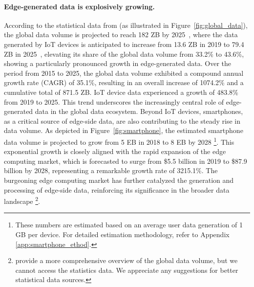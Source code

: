 \paragraph{Edge-generated data is explosively growing.} 
According to the statistical data from \cite{statista_global_2023,statista_iot_2023} (as illustrated in Figure~\ref{fig:global_data}), 
the global data volume is projected to reach 182 ZB by 2025~\cite{statista_global_2023}, where the data generated by IoT devices is anticipated to increase from 13.6 ZB in 2019 to 79.4 ZB in 2025~\cite{statista_iot_2023}, elevating its share of the global data volume from 33.2\% to 43.6\%, showing a particularly pronounced growth in edge-generated data. Over the period from 2015 to 2025, the global data volume exhibited a compound annual growth rate (CAGR) of 35.1\%, resulting in an overall increase of 1074.2\% and a cumulative total of 871.5 ZB. IoT device data experienced a growth of 483.8\% from 2019 to 2025. This trend underscores the increasingly central role of edge-generated data in the global data ecosystem.
Beyond IoT devices, smartphones, as a critical source of edge-side data, are also contributing to the steady rise in data volume. As depicted in Figure~\ref{fig:smartphone}, the estimated smartphone data volume is projected to grow from 5 EB in 2018 to 8 EB by 2028
\footnote{These numbers are estimated based on an average user data generation of 1 GB per device. For detailed estimation methodology, refer to Appendix \ref{app:smartphone_ethod}.}. 
This exponential growth is closely aligned with the rapid expansion of the edge computing market, which is forecasted to surge from \$5.5 billion in 2019 to \$87.9 billion by 2028, representing a remarkable growth rate of 3215.1\%. The burgeoning edge computing market has further catalyzed the generation and processing of edge-side data, reinforcing its significance in the broader data landscape 
\footnote{\cite{idc_seagate_dataage_2019,seagate_rethinkdata_2020} provide a more comprehensive overview of the global data volume, but we cannot access the statistics data. 
We appreciate any suggestions for better statistical data sources.
}.




